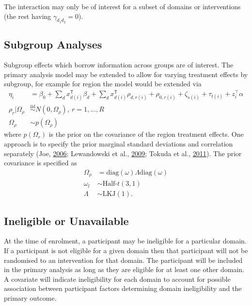 \documentclass[
  11pt,
]{article}
\begin{document}
The interaction may only be of interest for a subset of domains or interventions (the rest having \(\gamma_{d_1d_2}=0\)).

\hypertarget{subgroup-analyses}{%
\subsection{Subgroup Analyses}\label{subgroup-analyses}}

Subgroup effects which borrow information across groups are of interest.
The primary analysis model may be extended to allow for varying treatment effects by subgroup, for example for region the model would be extended via
\[
\begin{aligned}
\eta_i &= \beta_0 + \sum_{d} x_{d(i)}^{\mathsf{T}}\beta_{d} + \sum_{d} x_{d(i)}^{\mathsf{T}}\rho_{d,r(i)} + \rho_{0,r(i)} + \zeta_{s(i)} + \tau_{t(i)} + z_i^\top\alpha\\
\rho_{r}|\Omega_\rho &\overset{\text{iid}}{\sim} N(0, \Omega_\rho),\ r=1,...,R \\
\Omega_\rho &\sim p(\Omega_\rho)
\end{aligned}
\]
where \(p(\Omega_r)\) is the prior on the covariance of the region treatment effects.
One approach is to specify the prior marginal standard deviations and correlation separately (Joe, \protect\hyperlink{ref-joe2006generating}{2006}; Lewandowski et al., \protect\hyperlink{ref-lewandowski2009generating}{2009}; Tokuda et al., \protect\hyperlink{ref-tokuda2011visualizing}{2011}).
The prior covariance is specified as
\[
\begin{aligned}
\Omega_\rho &= \text{diag}(\omega)\Lambda\text{diag}(\omega) \\
\omega_{l} &\sim \text{Half-}t(3,1) \\
\Lambda &\sim \text{LKJ}(1).
\end{aligned}
\]

\hypertarget{ineligible-or-unavailable}{%
\subsection{Ineligible or Unavailable}\label{ineligible-or-unavailable}}

At the time of enrolment, a participant may be ineligible for a particular domain.
If a participant is not eligible for a given domain then that participant will not be randomised to an intervention for that domain.
The participant will be included in the primary analysis as long as they are eligible for at least one other domain.
A covariate will indicate ineligibility for each domain to account for possible association between participant factors determining domain ineligibility and the primary outcome.
\end{document}
